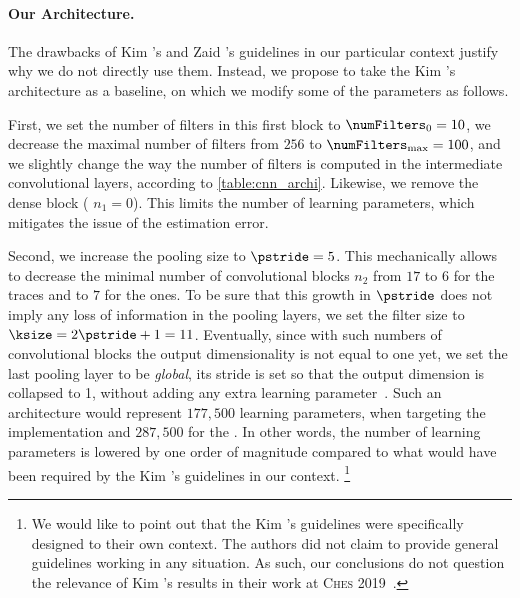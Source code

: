 \paragraph{Our Architecture.}
The drawbacks of Kim \etal{}'s and Zaid \etal{}'s guidelines in our particular context justify why we do not directly use them.
Instead, we propose to take the Kim \etal{}'s architecture as a baseline, on which we modify some of the parameters as follows.

First, we set the number of filters in this first block to \(\numFilters_0=10\), we decrease the maximal number of filters from \(256\) to \(\numFilters_{\max}=100\), and we slightly change the way the number of filters is computed in the intermediate convolutional layers, according to \autoref{table:cnn_archi}.
Likewise, we remove the dense block (\ie{} \(n_1=0\)).
This limits the number of learning parameters, which mitigates the issue of the estimation error.

Second, we increase the pooling size to \(\pstride = 5\).
This mechanically allows to decrease the minimal number of convolutional blocks \(n_2\) from \(17\) to \(6\) for the \mbedTLS{} traces and to \(7\) for the \aeshuitbit{} ones.
To be sure that this growth in \(\pstride\) does not imply any loss of information in the pooling layers, we set the filter size to \(\ksize = 2 \pstride+1=11\).
Eventually, since with such numbers of convolutional blocks the output dimensionality is not equal to one yet, we set the last pooling layer to be \emph{global}, \ie{} its stride is set so that the output dimension is collapsed to 1, without adding any extra learning parameter~\cite{zhou_learning_2016}.
Such an architecture would represent \(177,500\) learning parameters, when targeting the \mbedTLS{} implementation and \(287,500\) for the \aeshuitbit{}.
In other words, the number of learning parameters is lowered by one order of magnitude compared to what would have been required by the Kim \etal{}'s guidelines in our context.%
\footnote{
	We would like to point out that the Kim \etal{}'s guidelines were specifically designed to their own context. 
	The authors did not claim to provide general guidelines working in any situation.
	As such, our conclusions do not question the relevance of Kim \etal{}'s results in their work at \textsc{Ches} 2019~\cite{kim_make_2019}.
}

